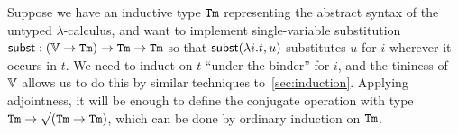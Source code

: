 \documentclass[10pt]{article}
\theoremstyle{definition}
\newcommand*{\id}{\mathsf{id}}
\newcommand*{\const}{\mathsf{const}}
\newcommand{\rformsym}{\surd}
\newcommand{\rformu}[1]{\ThisStyle{\raisebox{0.07em}{$\SavedStyle \rformsym$}} #1}
\begin{document}


Suppose we have an inductive type $\mathtt{Tm}$ representing the abstract
syntax of the untyped $\lambda$-calculus, and want to implement
single-variable substitution
$\mathsf{subst} : (\mathbb{V} \to \mathtt{Tm}) \to \mathtt{Tm} \to \mathtt{Tm}$ so that
$\mathsf{subst}(\lambda i. t, u)$ substitutes $u$ for $i$ wherever it occurs
in $t$. We need to induct on $t$ ``under the binder'' for $i$, and the
tininess of $\mathbb{V}$ allows us to do this by similar techniques
to~\cref{sec:induction}. Applying adjointness, it will be enough to
define the conjugate operation with type
$\iTm \to \rformu{(\iTm \to \iTm)}$, which can be done by ordinary
induction on $\mathtt{Tm}$.
\end{document}
